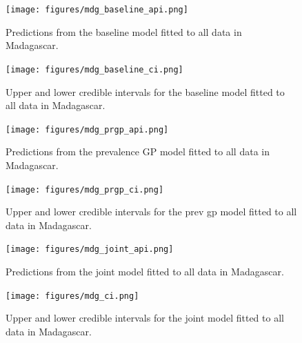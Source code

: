 \documentclass[10pt,a4]{article}
\begin{document}
\begin{figure}[h!]
\centering

\texttt{[image: figures/mdg\_baseline\_api.png]}

\caption{Predictions from the baseline model fitted to all data in Madagascar.}
\label{baselinemdg}
\end{figure}



\begin{figure}[h!]
\centering

\texttt{[image: figures/mdg\_baseline\_ci.png]}

\caption{Upper and lower credible intervals for the baseline model fitted to all data in Madagascar.}
\label{basemdgci}
\end{figure}



\begin{figure}[h!]
\centering

\texttt{[image: figures/mdg\_prgp\_api.png]}

\caption{Predictions from the prevalence GP model fitted to all data in Madagascar.}
\label{gpmdg}
\end{figure}



\begin{figure}[h!]
\centering

\texttt{[image: figures/mdg\_prgp\_ci.png]}

\caption{Upper and lower credible intervals for the prev gp model fitted to all data in Madagascar.}
\label{prgpmdgci}
\end{figure}


\begin{figure}[h!]
\centering

\texttt{[image: figures/mdg\_joint\_api.png]}

\caption{Predictions from the joint model fitted to all data in Madagascar.}
\label{jointmdg}
\end{figure}



\begin{figure}[h!]
\centering

\texttt{[image: figures/mdg\_ci.png]}

\caption{Upper and lower credible intervals for the joint model fitted to all data in Madagascar.}
\label{jointmdgci}
\end{figure}
\end{document}
